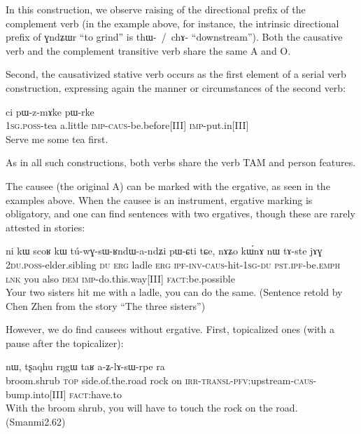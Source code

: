\documentclass[oldfontcommands,oneside,a4paper,11pt]{article}
\newcommand{\ipa}[1]{{\phon \mbox{#1}}} %
\newcommand{\sg}{\textsc{sg}}
\newcommand{\jg}[1]{\ipa{#1}\index{Japhug #1}}
\newcommand{\wav}[1]{}%
\newcommand{\pfv}{\textsc{pfv}}
\newcommand{\caus}{\textsc{caus}}
\newcommand{\lnk}{\textsc{lnk}}
\newcommand{\dem}{\textsc{dem}}
\newcommand{\du}{\textsc{du}}
\newcommand{\erg}{\textsc{erg}}
\newcommand{\emphat}{\textsc{emph}}
\newcommand{\imp}{\textsc{imp}}
\newcommand{\inv}{\textsc{inv}}
\newcommand{\ipf}{\textsc{ipf}}
\newcommand{\irr}{\textsc{irr}}
\newcommand{\fact}{\textsc{fact}}
\newcommand{\poss}{\textsc{poss}}
\newcommand{\pst}{\textsc{pst}}
\newcommand{\topic}{\textsc{top}}
\newcommand{\transloc}{\textsc{transl}}
\begin{document}
In this construction, we observe raising of the directional prefix of the complement verb (in the example above, for instance, the intrinsic directional prefix of \jg{ɣndʑɯr} ``to grind'' is \ipa{thɯ- / chɤ-} ``downstream''). Both the causative verb and the complement transitive verb share the same A and O.

Second, the causativized stative verb occurs as the first element of a serial verb construction, expressing again the manner or circumstances of the second verb:

\begin{exe}
\ex
\gll \ipa{a-tʂha} 	\ipa{ci} 	\ipa{pɯ-z-mɤke} 	\ipa{pɯ-rke} \\
1\sg{}.\poss{}-tea a.little \imp{}-\caus{}-be.before[III] \imp{}-put.in[III] \\
\glt  Serve me some tea first.
\end{exe} 
As in all such constructions, both verbs share the verb TAM and person features.

 
The causee (the original A) can be marked with the ergative, as seen in the examples above. When the causee is an instrument, ergative marking is obligatory, and one can find sentences with two ergatives, though these are rarely attested in stories:
\begin{exe}
\ex
\gll \ipa{nɤ-pi} 	\ipa{ni} 	\ipa{kɯ} 	\ipa{scoʁ} 	\ipa{kɯ} 	\ipa{tú-wɣ-sɯ-ʁndɯ-a-ndʑi} 	\ipa{pɯ-ɕti} 	\ipa{tɕe,} 	\ipa{nɤʑo} 	\ipa{kɯ́nɤ} 	\ipa{nɯ} 	\ipa{tɤ-ste} 	\ipa{jɤɣ}  \\
2\du{}.\poss{}-elder.sibling \du{} \erg{} ladle \erg{} \ipf{}-\inv{}-\caus{}-hit-1\sg{}-\du{} \pst{}.\ipf{}-be.\emphat{} \lnk{} you also \dem{} \imp{}-do.this.way[III] \fact{}:be.possible  \\
\glt   Your two sisters hit me with a ladle, you can do the same. (Sentence retold by Chen Zhen from the story ``The three sisters'') \wav{8_scoRkW}
\end{exe} 


However, we do find  causees without ergative. First, topicalized ones (with a pause after the topicalizer):
\begin{exe}
\ex
\gll  \ipa{phuɲi} 	\ipa{nɯ}, 	\ipa{tʂaqhu} 	\ipa{rŋgɯ} 	\ipa{taʁ} 	\ipa{a-ʑ-lɤ-sɯ-rpe} 	\ipa{ra}  \\
 broom.shrub \topic{} side.of.the.road rock on \irr{}-\transloc{}-\pfv{}:upstream-\caus{}-bump.into[III] \fact{}:have.to   \\
 \glt   With the broom shrub, you will have to touch the rock on the road. (Smanmi2.62)
\end{exe} 
 
\end{document}

